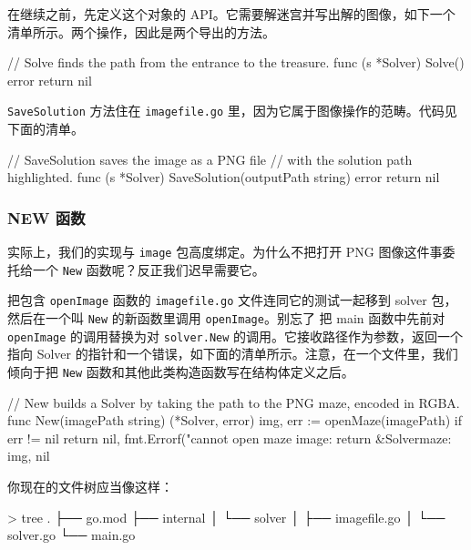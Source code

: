 在继续之前，先定义这个对象的 API。它需要解迷宫并写出解的图像，如下一个清单所示。两个操作，因此是两个导出的方法。

\begin{gocode}[title={代码清单 9.4 \texttt{solver.go}：\texttt{Solve} API}]
// Solve finds the path from the entrance to the treasure.
func (s *Solver) Solve() error {
    return nil
}
\end{gocode}

\texttt{SaveSolution} 方法住在 \texttt{imagefile.go} 里，因为它属于图像操作的范畴。代码见下面的清单。

\begin{gocode}[title={代码清单 9.5 \texttt{imagefile.go}：保存解的 API}]
// SaveSolution saves the image as a PNG file
// with the solution path highlighted.
func (s *Solver) SaveSolution(outputPath string) error {
    return nil
}
\end{gocode}

\subsubsection*{NEW 函数}

实际上，我们的实现与 \texttt{image} 包高度绑定。为什么不把打开 PNG 图像这件事委托给一个 \texttt{New} 函数呢？反正我们迟早需要它。

把包含 \texttt{openImage} 函数的 \texttt{imagefile.go} 文件连同它的测试一起移到 solver 包，然后在一个叫 \texttt{New} 的新函数里调用 \texttt{openImage}。别忘了
把 main 函数中先前对 \texttt{openImage} 的调用替换为对 \texttt{solver.New} 的调用。它接收路径作为参数，返回一个指向 Solver 的指针和一个错误，如下面的清单所示。注意，在一个文件里，我们倾向于把 \texttt{New} 函数和其他此类构造函数写在结构体定义之后。

\begin{gocode}[title={代码清单 9.6 \texttt{solver.go}：新建 \texttt{Solver}}]
// New builds a Solver by taking the path to the PNG maze, encoded in RGBA.
func New(imagePath string) (*Solver, error) {
    img, err := openMaze(imagePath)
    if err != nil {
        return nil, fmt.Errorf("cannot open maze image: %
    }
    return &Solver{maze: img}, nil
}
\end{gocode}

你现在的文件树应当像这样：

\begin{shellcode}[]
> tree
.
├── go.mod
├── internal
│   └── solver
│       ├── imagefile.go
│       └── solver.go
└── main.go
\end{shellcode}

